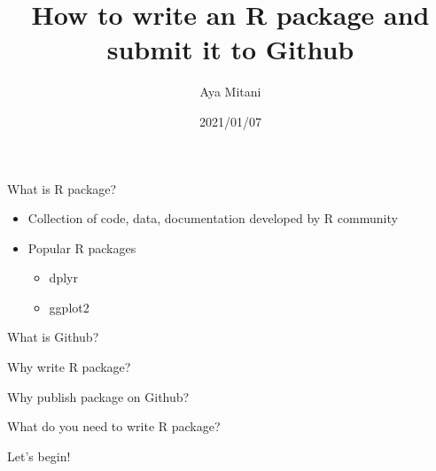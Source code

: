 \documentclass[
  ignorenonframetext,
]{beamer}
\title{How to write an R package and submit it to Github}
\author{Aya Mitani}
\date{2021/01/07}
\providecommand{\tightlist}{%
  \setlength{\itemsep}{0pt}\setlength{\parskip}{0pt}}
\begin{document}
\frame{\titlepage}

\begin{frame}{What is R package?}
\protect\hypertarget{what-is-r-package}{}

\begin{itemize}
\tightlist
\item
  Collection of code, data, documentation developed by R community
\item
  Popular R packages

  \begin{itemize}
  \tightlist
  \item
    dplyr
  \item
    ggplot2
  \end{itemize}
\end{itemize}

\end{frame}

\begin{frame}{What is Github?}
\protect\hypertarget{what-is-github}{}

\end{frame}

\begin{frame}{Why write R package?}
\protect\hypertarget{why-write-r-package}{}

\end{frame}

\begin{frame}{Why publish package on Github?}
\protect\hypertarget{why-publish-package-on-github}{}

\end{frame}

\begin{frame}{What do you need to write R package?}
\protect\hypertarget{what-do-you-need-to-write-r-package}{}

\end{frame}

\begin{frame}{Let's begin!}
\protect\hypertarget{lets-begin}{}

\end{frame}
\end{document}
